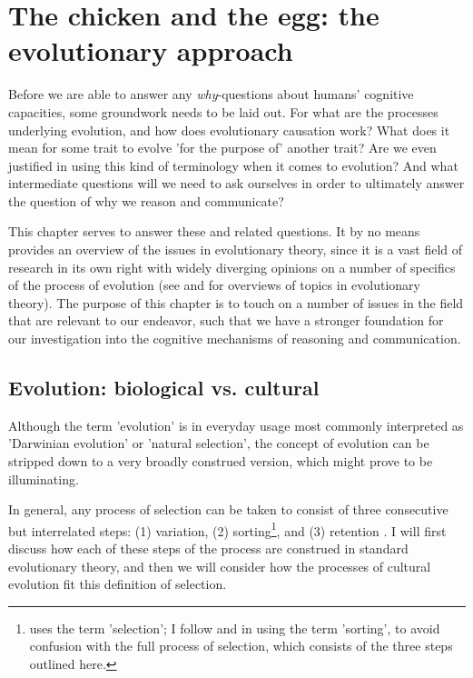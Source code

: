 \chapter{The chicken and the egg: the evolutionary approach}
\label{ch:evolution}

Before we are able to answer any \emph{why}-questions about humans' cognitive capacities, some groundwork needs to be laid out. For what are the processes underlying evolution, and how does evolutionary causation work? What does it mean for some trait to evolve 'for the purpose of' another trait? Are we even justified in using this kind of terminology when it comes to evolution? And what intermediate questions will we need to ask ourselves in order to ultimately answer the question of why we reason and communicate?

This chapter serves to answer these and related questions. It by no means provides an overview of the issues in evolutionary theory, since it is a vast field of research in its own right with widely diverging opinions on a number of specifics of the process of evolution (see \citet{Ariew02} and \citet{UllerLaland19} for overviews of topics in evolutionary theory).
The purpose of this chapter is to touch on a number of issues in the field that are relevant to our endeavor, such that we have a stronger foundation for our investigation into the cognitive mechanisms of reasoning and communication.

\section{Evolution: biological vs. cultural}
\label{sec:evo-bio-culture}


Although the term 'evolution' is in everyday usage most commonly interpreted as 'Darwinian evolution' or 'natural selection', the concept of evolution can be stripped down to a very broadly construed version, which might prove to be illuminating.

In general, any process of selection can be taken to consist of three consecutive but interrelated steps: (1) variation, (2) sorting\footnote{\citet{Donahoe03} uses the term 'selection'; I follow \citet{Heyes18} and \citet{S-P13} in using the term 'sorting', to avoid confusion with the full process of selection, which consists of the three steps outlined here.}, and (3) retention \citep{Donahoe03}. I will first discuss how each of these steps of the process are construed in standard evolutionary theory, and then we will consider how the processes of cultural evolution fit this definition of selection.

